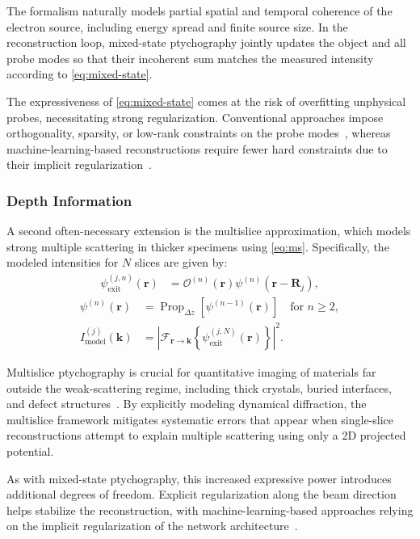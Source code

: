 \documentclass[pdflatex,sn-aps,iicol]{sn-jnl}%
\begin{document}
The formalism naturally models partial spatial and temporal coherence of the electron source, including energy spread and finite source size.
In the reconstruction loop, mixed-state ptychography jointly updates the object and all probe modes so that their incoherent sum matches the measured intensity according to \cref{eq:mixed-state}.

The expressiveness of \cref{eq:mixed-state} comes at the risk of overfitting unphysical probes, necessitating strong regularization.
Conventional approaches impose orthogonality, sparsity, or low-rank constraints on the probe modes~\cite{Odstrcil_2016,Varnavides_2023}, whereas machine-learning-based reconstructions require fewer hard constraints due to their implicit regularization~\cite{McCray_2025}.

\subsubsection{Depth Information}

A second often-necessary extension is the multislice approximation, which models strong multiple scattering in thicker specimens using \cref{eq:ms}.
Specifically, the modeled intensities for $N$ slices are given by:
\begin{align}
\psi_{\text{exit}}^{(j,n)}(\boldsymbol{r})
&=
\mathcal{O}^{(n)}(\boldsymbol{r})
\psi^{(n)}(\boldsymbol{r}-\boldsymbol{R}_j),
\label{eq:multi-slice-01}
\end{align}
\begin{align}
\psi^{(n)}(\boldsymbol{r})
&=
\operatorname{Prop}_{\Delta z}
\left[
\psi^{(n-1)}(\boldsymbol{r})
\right]
\quad \text{for } n \geq 2,\\
I_{\text{model}}^{(j)}(\boldsymbol{k})
&=
\left\lvert
\mathcal{F}_{\boldsymbol{r}\to\boldsymbol{k}}
\left\{
\psi_{\text{exit}}^{(j,N)}(\boldsymbol{r})
\right\}
\right\rvert^2.
\label{eq:multi-slice-02}
\end{align}

Multislice ptychography is crucial for quantitative imaging of materials far outside the weak-scattering regime, including thick crystals, buried interfaces, and defect structures~\cite{Ribet_2024}.
By explicitly modeling dynamical diffraction, the multislice framework mitigates systematic errors that appear when single-slice reconstructions attempt to explain multiple scattering using only a 2D projected potential.

As with mixed-state ptychography, this increased expressive power introduces additional degrees of freedom.
Explicit regularization along the beam direction helps stabilize the reconstruction, with machine-learning-based approaches relying on the implicit regularization of the network architecture~\cite{McCray_2025}.
\end{document}
